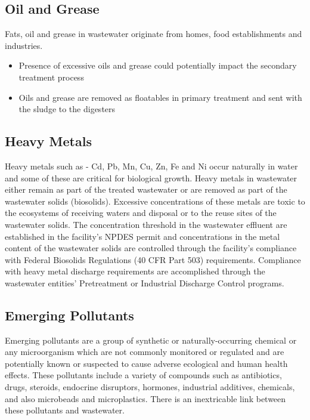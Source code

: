 \subsection{Oil and Grease}	
			Fats, oil and grease in wastewater originate from homes, food establishments and industries.
			\begin{itemize}
				\item Presence of excessive oils and grease could potentially impact the secondary treatment process
				\item Oils and grease are removed as floatables in primary treatment and sent with the sludge to the digesters
			\end{itemize}


\subsection{Heavy Metals}	
Heavy metals such as - Cd, Pb, Mn, Cu, Zn, Fe and Ni occur naturally in water and some of these are critical for biological growth.  Heavy metals in wastewater either remain as part of the treated wastewater or are removed as part of the wastewater solids (biosolids).  Excessive concentrations of these metals are toxic to the ecosystems of receiving waters and disposal or to the reuse sites of the wastewater solids.  The concentration threshold in the wastewater effluent are established in the facility's NPDES permit and concentrations in the metal content of the wastewater solids are controlled through the facility's compliance with Federal Biosolids Regulations (40 CFR Part 503) requirements.  Compliance with heavy metal discharge requirements are accomplished through the wastewater entities' Pretreatment or Industrial Discharge Control programs.

\subsection{Emerging Pollutants}				
Emerging pollutants are a group of synthetic or naturally-occurring chemical or any microorganism which are not commonly monitored or regulated and are potentially known or suspected to cause adverse ecological and human health effects. These pollutants include a variety of compounds such as antibiotics, drugs, steroids, endocrine disruptors, hormones, industrial additives, chemicals, and also microbeads and microplastics. There is an inextricable link between these pollutants and wastewater.


